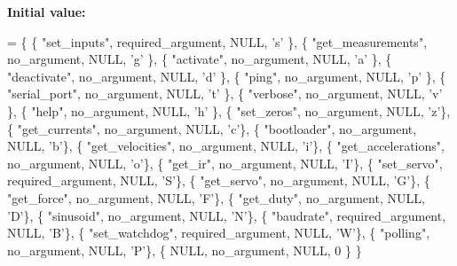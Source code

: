 {\bfseries Initial value\+:}
\begin{DoxyCode}
= \{
    \{ \textcolor{stringliteral}{"set\_inputs"}, required\_argument, NULL, \textcolor{charliteral}{'s'} \},
    \{ \textcolor{stringliteral}{"get\_measurements"}, no\_argument, NULL, \textcolor{charliteral}{'g'} \},
    \{ \textcolor{stringliteral}{"activate"}, no\_argument, NULL, \textcolor{charliteral}{'a'} \},
    \{ \textcolor{stringliteral}{"deactivate"}, no\_argument, NULL, \textcolor{charliteral}{'d'} \},
    \{ \textcolor{stringliteral}{"ping"}, no\_argument, NULL, \textcolor{charliteral}{'p'} \},
    \{ \textcolor{stringliteral}{"serial\_port"}, no\_argument, NULL, \textcolor{charliteral}{'t'} \},
    \{ \textcolor{stringliteral}{"verbose"}, no\_argument, NULL, \textcolor{charliteral}{'v'} \},
    \{ \textcolor{stringliteral}{"help"}, no\_argument, NULL, \textcolor{charliteral}{'h'} \},
    \{ \textcolor{stringliteral}{"set\_zeros"}, no\_argument, NULL, \textcolor{charliteral}{'z'}\},
    \{ \textcolor{stringliteral}{"get\_currents"}, no\_argument, NULL, \textcolor{charliteral}{'c'}\},
    \{ \textcolor{stringliteral}{"bootloader"}, no\_argument, NULL, \textcolor{charliteral}{'b'}\},
    \{ \textcolor{stringliteral}{"get\_velocities"}, no\_argument, NULL, \textcolor{charliteral}{'i'}\},
    \{ \textcolor{stringliteral}{"get\_accelerations"}, no\_argument, NULL, \textcolor{charliteral}{'o'}\},
    \{ \textcolor{stringliteral}{"get\_ir"}, no\_argument, NULL, \textcolor{charliteral}{'I'}\},
    \{ \textcolor{stringliteral}{"set\_servo"}, required\_argument, NULL, \textcolor{charliteral}{'S'}\},
    \{ \textcolor{stringliteral}{"get\_servo"}, no\_argument, NULL, \textcolor{charliteral}{'G'}\},
    \{ \textcolor{stringliteral}{"get\_force"}, no\_argument, NULL, \textcolor{charliteral}{'F'}\},
    \{ \textcolor{stringliteral}{"get\_duty"}, no\_argument, NULL, \textcolor{charliteral}{'D'}\},
    \{ \textcolor{stringliteral}{"sinusoid"}, no\_argument, NULL, \textcolor{charliteral}{'N'}\},
    \{ \textcolor{stringliteral}{"baudrate"}, required\_argument, NULL, \textcolor{charliteral}{'B'}\},
    \{ \textcolor{stringliteral}{"set\_watchdog"}, required\_argument, NULL, \textcolor{charliteral}{'W'}\},
    \{ \textcolor{stringliteral}{"polling"}, no\_argument, NULL, \textcolor{charliteral}{'P'}\},
    \{ NULL, no\_argument, NULL, 0 \}
\}
\end{DoxyCode}
